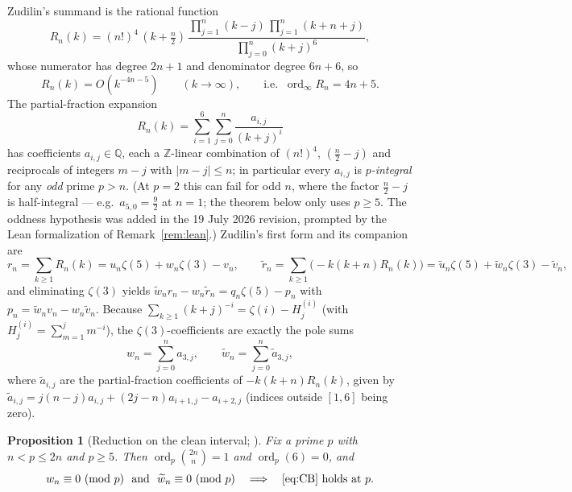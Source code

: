 \documentclass[11pt]{article}
\newtheorem{proposition}[theorem]{Proposition}
\theoremstyle{definition}
\DeclareMathOperator{\ord}{ord}
\newcommand{\Z}{\mathbb{Z}}
\newcommand{\Q}{\mathbb{Q}}
\newcommand{\zt}[1]{\zeta(#1)}
\newcommand{\bin}[2]{\binom{#1}{#2}}
\newcommand{\wt}{\widetilde}
\begin{document}
Zudilin's summand is the rational function
\begin{equation}\label{eq:Rn}
R_n(k)=(n!)^4\,(k+\tfrac n2)\,
\frac{\prod_{j=1}^{n}(k-j)\,\prod_{j=1}^{n}(k+n+j)}
     {\prod_{j=0}^{n}(k+j)^6},
\end{equation}
whose numerator has degree $2n+1$ and denominator degree $6n+6$, so
\begin{equation}\label{eq:decay}
R_n(k)=O\!\left(k^{-4n-5}\right)\qquad(k\to\infty),\qquad
\text{i.e. }\ \ord_\infty R_n=4n+5 .
\end{equation}
The partial-fraction expansion
\begin{equation}\label{eq:pf}
R_n(k)=\sum_{i=1}^{6}\sum_{j=0}^{n}\frac{a_{i,j}}{(k+j)^i}
\end{equation}
has coefficients $a_{i,j}\in\Q$, each a $\Z$-linear combination of $(n!)^4$,
$(\tfrac n2-j)$ and reciprocals of integers $m-j$ with $|m-j|\le n$; in
particular every $a_{i,j}$ is \emph{$p$-integral} for any \emph{odd} prime
$p>n$. (At $p=2$ this can fail for odd $n$, where the factor $\tfrac n2-j$ is
half-integral --- e.g.\ $a_{5,0}=\tfrac92$ at $n=1$; the theorem below only
uses $p\ge5$. The oddness hypothesis was added in the 19 July 2026 revision,
prompted by the Lean formalization of Remark~\ref{rem:lean}.) Zudilin's
first form and its companion are
\[
r_n=\sum_{k\ge1}R_n(k)=u_n\zt5+w_n\zt3-v_n,\qquad
\widetilde r_n=\sum_{k\ge1}\bigl(-k(k+n)R_n(k)\bigr)
=\wt u_n\zt5+\wt w_n\zt3-\wt v_n,
\]
and eliminating $\zt3$ yields $\widetilde w_n r_n-w_n\widetilde r_n=q_n\zt5-p_n$
with $p_n=\widetilde w_n v_n-w_n\widetilde v_n$. Because
$\sum_{k\ge1}(k+j)^{-i}=\zt i-H_j^{(i)}$ (with $H_j^{(i)}=\sum_{m=1}^{j}m^{-i}$),
the $\zt3$-coefficients are exactly the pole sums
\begin{equation}\label{eq:w}
w_n=\sum_{j=0}^n a_{3,j},\qquad
\wt w_n=\sum_{j=0}^n \wt a_{3,j},
\end{equation}
where $\wt a_{i,j}$ are the partial-fraction coefficients of
$-k(k+n)R_n(k)$, given by
$\wt a_{i,j}=j(n-j)a_{i,j}+(2j-n)a_{i+1,j}-a_{i+2,j}$ (indices outside
$[1,6]$ being zero).

\begin{proposition}[Reduction on the clean interval; {\cite[\S1]{LemmaCB}}]
\label{prop:reduction}
Fix a prime $p$ with $n<p\le2n$ and $p\ge5$. Then $\ord_p\bin{2n}{n}=1$ and
$\ord_p(6)=0$, and
\[
w_n\equiv 0 \ (\mathrm{mod}\ p)\ \ \text{and}\ \ \wt w_n\equiv 0\ (\mathrm{mod}\ p)
\quad\Longrightarrow\quad \eqref{eq:CB}\text{ holds at }p .
\]
\end{proposition}
\end{document}
